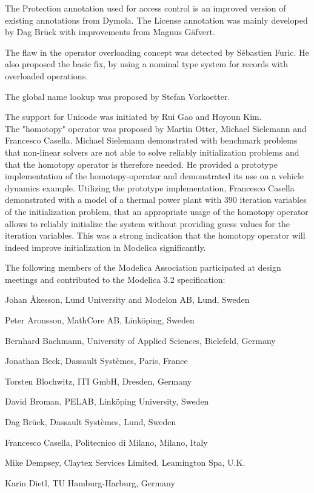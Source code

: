 \documentclass[10pt,a4paper]{report}
\begin{document}
The Protection annotation used for access control is an improved version
of existing annotations from Dymola. The License annotation was mainly
developed by Dag Brück with improvements from Magnus Gäfvert.

The flaw in the operator overloading concept was detected by Sébastien
Furic. He also proposed the basic fix, by using a nominal type system
for records with overloaded operations.

The global name lookup was proposed by Stefan Vorkoetter.

The support for Unicode was initiated by Rui Gao and Hoyoun Kim.\\
The "homotopy" operator was proposed by Martin Otter, Michael Sielemann
and Francesco Casella. Michael Sielemann demonstrated with benchmark
problems that non-linear solvers are not able to solve reliably
initialization problems and that the homotopy operator is therefore
needed. He provided a prototype implementation of the homotopy-operator
and demonstrated its use on a vehicle dynamics example. Utilizing the
prototype implementation, Francesco Casella demonstrated with a model of
a thermal power plant with 390 iteration variables of the initialization
problem, that an appropriate usage of the homotopy operator allows to
reliably initialize the system without providing guess values for the
iteration variables. This was a strong indication that the homotopy
operator will indeed improve initialization in Modelica significantly.

The following members of the Modelica Association participated at design
meetings and contributed to the Modelica 3.2 specification:

Johan Åkesson, Lund University and Modelon AB, Lund, Sweden

Peter Aronsson, MathCore AB, Linköping, Sweden

Bernhard Bachmann, University of Applied Sciences, Bielefeld, Germany

Jonathan Beck, Dassault Systèmes, Paris, France

Torsten Blochwitz, ITI GmbH, Dresden, Germany

David Broman, PELAB, Linköping University, Sweden

Dag Brück, Dassault Systèmes, Lund, Sweden

Francesco Casella, Politecnico di Milano, Milano, Italy

Mike Dempsey, Claytex Services Limited, Leamington Spa, U.K.

Karin Dietl, TU Hamburg-Harburg, Germany
\end{document}
